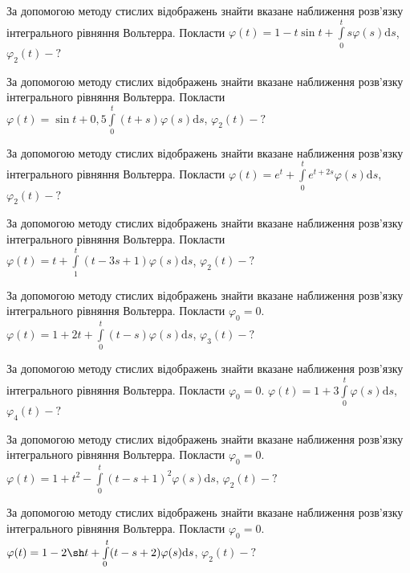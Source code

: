 \documentclass[12pt]{extarticle}
\begin{document}
\begin{Exercise}
За допомогою методу стислих відображень знайти вказане наближення розв’язку інтегрального рівняння Вольтерра. Покласти $\varphi(t) = 1 - t\sin t + \int\limits_{0}^{t} s \varphi(s) \mathrm{d}s$, $\varphi_2(t) - ?$
\end{Exercise}

\begin{Exercise}
За допомогою методу стислих відображень знайти вказане наближення розв’язку інтегрального рівняння Вольтерра. Покласти $\varphi(t) = \sin t + 0,5\int\limits_{0}^{t} (t+s) \varphi(s) \mathrm{d}s$, $\varphi_2(t) - ?$
\end{Exercise}

\begin{Exercise}
За допомогою методу стислих відображень знайти вказане наближення розв’язку інтегрального рівняння Вольтерра. Покласти $\varphi(t) = e^t + \int\limits_{0}^{t} e^{t+2s} \varphi(s) \mathrm{d}s$, $\varphi_2(t) - ?$
\end{Exercise}

\begin{Exercise}
За допомогою методу стислих відображень знайти вказане наближення розв’язку інтегрального рівняння Вольтерра. Покласти $\varphi(t) = t + \int\limits_{1}^{t} (t-3s+1)\varphi(s) \mathrm{d}s$, $\varphi_2(t) - ?$
\end{Exercise}

\begin{Exercise}
За допомогою методу стислих відображень знайти вказане наближення розв’язку інтегрального рівняння Вольтерра. Покласти $\varphi_0=0$. $\varphi(t) = 1 + 2t + \int\limits_{0}^{t} (t-s)\varphi(s) \mathrm{d}s$, $\varphi_3(t) - ?$
\end{Exercise}

\begin{Exercise}
За допомогою методу стислих відображень знайти вказане наближення розв’язку інтегрального рівняння Вольтерра. Покласти $\varphi_0=0$. $\varphi(t) = 1 + 3\int\limits_{0}^{t} \varphi(s) \mathrm{d}s$, $\varphi_4(t) - ?$
\end{Exercise}

\begin{Exercise}
За допомогою методу стислих відображень знайти вказане наближення розв’язку інтегрального рівняння Вольтерра. Покласти $\varphi_0=0$. $\varphi(t) = 1 + t^2 - \int\limits_{0}^{t} (t-s+1)^2 \varphi(s) \mathrm{d}s$, $\varphi_2(t) - ?$
\end{Exercise}

\begin{Exercise}
За допомогою методу стислих відображень знайти вказане наближення розв’язку інтегрального рівняння Вольтерра. Покласти $\varphi_0=0$. $\varphi(t) = 1 - 2\sh t + \int\limits_{0}^{t} (t-s+2)\varphi(s) \mathrm{d}s$, $\varphi_2(t) - ?$
\end{Exercise}
\end{document}

